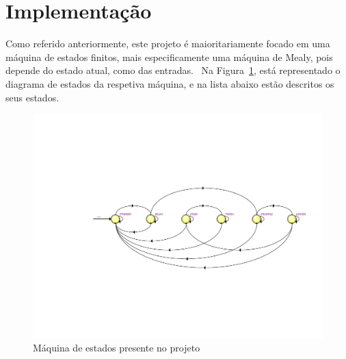 \documentclass{article}
\begin{document}
    \newpage
    \section{Implementação}\label{sec:implementacao}
        Como referido anteriormente, este projeto é maioritariamente focado em uma máquina de estados finitos, mais especificamente uma máquina de Mealy, pois depende do estado atual, como das entradas. \ Na Figura~\ref{fig:fsm}, está representado o diagrama de estados da respetiva máquina, e na lista abaixo estão descritos os seus estados.

    \begin{figure}[H]
        \centering
        \includegraphics[scale=0.4]{FSM}
        \caption{Máquina de estados presente no projeto}
        \label{fig:fsm}
    \end{figure}
\end{document}
